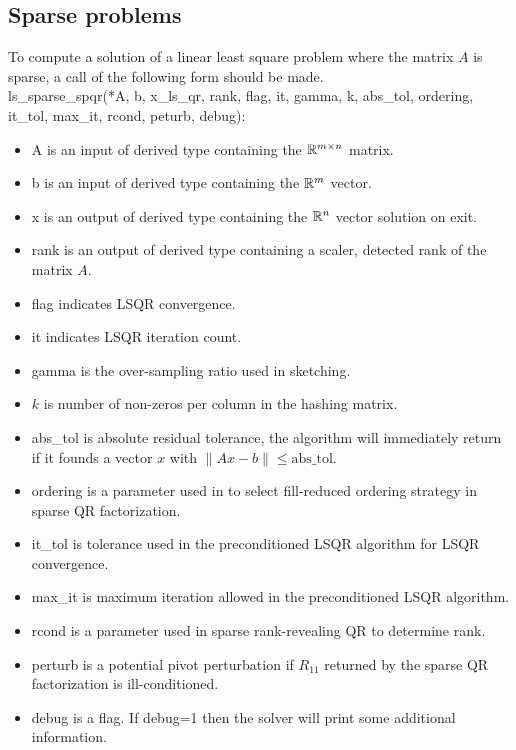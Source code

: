 \documentclass[english,11pt]{article}
\begin{document}
\subsection{Sparse problems}

To compute a solution of a linear least square problem where the matrix $A$ is sparse, a call of the following form should be made. \\

ls_sparse_spqr(*A, b, x_ls_qr, 
    rank, flag, it, gamma, k, abs_tol, ordering, it_tol, max_it, rcond, peturb, debug):

\begin{itemize}
	\setlength\itemsep{-0.5em}
	\item A is an input of derived type containing the $\mathbb{R}^{m\times n}$ matrix.

	\item b is an input of derived type containing the $\mathbb{R}^m$ vector.

	\item x is an output of derived type containing the $\mathbb{R}^n$ vector solution on exit. 

	\item rank is an output of derived type containing a scaler, detected rank of the matrix $A$. 

	\item flag indicates LSQR convergence. 

	\item it indicates LSQR iteration count. 

	\item gamma is the over-sampling ratio used in sketching. 

	\item $k$ is number of non-zeros per column in the hashing matrix.

	\item abs_tol is absolute residual tolerance, the algorithm will immediately return if it founds a vector $x$ with $\|Ax-b\| \leq \text{abs_tol}$.

	\item ordering is a parameter used in to select fill-reduced ordering strategy in sparse QR factorization.

	\item it_tol is tolerance used in the preconditioned LSQR algorithm for LSQR convergence.

	\item max_it is maximum iteration allowed in the preconditioned LSQR algorithm. 

	\item rcond is a parameter used in sparse rank-revealing QR to determine rank. 

	\item perturb is a potential pivot perturbation if $R_{11}$ returned by the sparse QR factorization is ill-conditioned. 

	\item debug is a flag. If debug=1 then the solver will print some additional information. 

\end{itemize}
\end{document}
